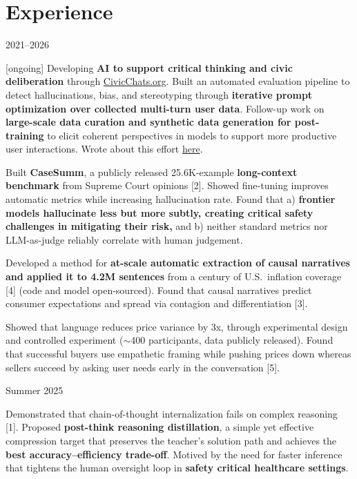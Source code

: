\documentclass[11pt,letterpaper]{article}
\begin{document}
\section*{Experience}
\vspace{4pt}
 \hfill 2021--2026
\begin{cvitems}
    \item {[ongoing]} Developing \textbf{AI to support critical thinking and civic deliberation} through \href{https://civicchats.org}{CivicChats.org}. Built an automated evaluation pipeline to detect hallucinations, bias, and stereotyping through \textbf{iterative prompt optimization over collected multi-turn user data}. Follow-up work on \textbf{large-scale data curation and synthetic data generation for post-training} to elicit coherent perspectives in models to support more productive user interactions. Wrote about this effort \href{https://open.substack.com/pub/cichicago/p/civicchats-building-ai-to-support}{here}.
    \item Built \textbf{CaseSumm}, a publicly released 25.6K-example \textbf{long-context benchmark} from Supreme Court opinions [2]. Showed fine-tuning improves automatic metrics while increasing hallucination rate. Found that a) \textbf{frontier models hallucinate less but more subtly, creating critical safety challenges in mitigating their risk,} and b) neither standard metrics nor LLM-as-judge reliably correlate with human judgement.
    \item Developed a method for \textbf{at-scale automatic extraction of causal narratives and applied it to 4.2M sentences} from a century of U.S.\ inflation coverage [4] (code and model open-sourced). Found that causal narratives predict consumer expectations and spread via contagion and differentiation [3].
    \item Showed that language reduces price variance by 3x, through experimental design and controlled experiment ($\sim$400 participants, data publicly released). Found that successful buyers use empathetic framing while pushing prices down whereas sellers succeed by asking user needs early in the conversation [5].
\end{cvitems}

\vspace{4pt}
 \hfill Summer 2025
\begin{cvitems}
    \item Demonstrated that chain-of-thought internalization fails on complex reasoning [1]. Proposed \textbf{post-think reasoning distillation}, a simple yet effective compression target that preserves the teacher's solution path and achieves the \textbf{best accuracy--efficiency trade-off}. Motived by the need for faster inference that tightens the human oversight loop in \textbf{safety critical healthcare settings}.
\end{cvitems}
\end{document}
